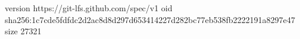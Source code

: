 version https://git-lfs.github.com/spec/v1
oid sha256:1c7cde5fdfdc2d2ac8d8d297d653414227d282bc77eb538fb2222191a8297e47
size 27321
